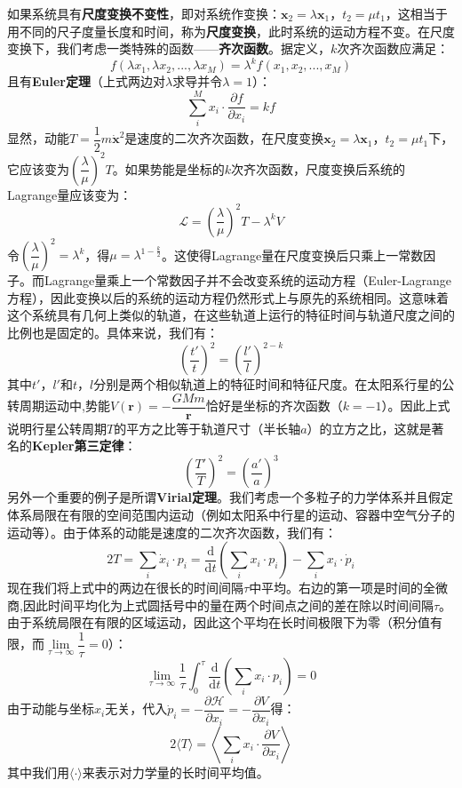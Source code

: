 \documentclass[a4paper,openany]{book}
\begin{document}
如果系统具有\textbf{尺度变换不变性}，即对系统作变换：$\bm{x}_2 = \lambda \bm{x}_1$，$t_2 = \mu t_1$，这相当于用不同的尺子度量长度和时间，称为\textbf{尺度变换}，此时系统的运动方程不变。在尺度变换下，我们考虑一类特殊的函数——\textbf{齐次函数}。据定义，$k$次齐次函数应满足：
\[
    \boxed{f(\lambda x_1, \lambda x_2,...,\lambda x_M) = \lambda^k f(x_1,x_2,...,x_M)}
\]
且有\textbf{Euler定理}（上式两边对$\lambda$求导并令$\lambda=1$）：
\[
    \boxed{\sum_i^M x_i \cdot \frac{\partial f}{\partial x_i} = kf}
\]
显然，动能$T = \dfrac{1}{2}m\bm{\dot{x}}^2$是速度的二次齐次函数，在尺度变换$\bm{x}_2 = \lambda \bm{x}_1$，$t_2 = \mu t_1$下，它应该变为$\left(\dfrac{\lambda}{\mu}\right)^2 T$。如果势能是坐标的$k$次齐次函数，尺度变换后系统的Lagrange量应该变为：
\[
    \mathcal{L} = \left(\frac{\lambda}{\mu}\right)^2 T - \lambda^k V
\]
令$\left(\dfrac{\lambda}{\mu}\right)^2 = \lambda^k$，得$\mu = \lambda^{1-\tfrac{k}{2}}$。这使得Lagrange量在尺度变换后只乘上一常数因子。而Lagrange量乘上一个常数因子并不会改变系统的运动方程（Euler-Lagrange方程），因此变换以后的系统的运动方程仍然形式上与原先的系统相同。这意味着这个系统具有几何上类似的轨道，在这些轨道上运行的特征时间与轨道尺度之间的比例也是固定的。具体来说，我们有：
\[
    \left(\frac{t'}{t}\right)^2 = \left(\frac{l'}{l}\right)^{2-k}
\]
其中$t'$，$l'$和$t$，$l$分别是两个相似轨道上的特征时间和特征尺度。在太阳系行星的公转周期运动中,势能$V(\bm{r}) = -\dfrac{GMm}{\bm{r}}$恰好是坐标的齐次函数（$k=-1$）。因此上式说明行星公转周期$T$的平方之比等于轨道尺寸（半长轴$a$）的立方之比，这就是著名的\textbf{Kepler第三定律}：
\[
    \boxed{\left(\frac{T'}{T}\right)^2 = \left(\frac{a'}{a}\right)^3}
\]
另外一个重要的例子是所谓\textbf{Virial定理}。我们考虑一个多粒子的力学体系并且假定体系局限在有限的空间范围内运动（例如太阳系中行星的运动、容器中空气分子的运动等）。由于体系的动能是速度的二次齐次函数，我们有：
\[
    2T = \sum_i \dot{x}_i \cdot p_i = \frac{\mathrm{d}}{\mathrm{d}t}\left(\sum_i x_i \cdot p_i\right) - \sum_i x_i \cdot \dot{p}_i
\]
现在我们将上式中的两边在很长的时间间隔$\tau$中平均。右边的第一项是时间的全微商,因此时间平均化为上式圆括号中的量在两个时间点之间的差在除以时间间隔$\tau$。由于系统局限在有限的区域运动，因此这个平均在长时间极限下为零（积分值有限，而$\lim\limits_{\tau \to \infty}\dfrac{1}{\tau} = 0$）：
\[
    \lim_{\tau \to \infty}\frac{1}{\tau}\int_0^\tau \frac{\mathrm{d}}{\mathrm{d}t}\left(\sum_i x_i \cdot p_i\right) = 0
\]
由于动能与坐标$x_i$无关，代入$\dot{p}_i = -\dfrac{\partial \mathcal{H}}{\partial x_i} = -\dfrac{\partial V}{\partial x_i}$得：
\[
    2\langle T \rangle = \left\langle \sum_i x_i \cdot \frac{\partial V}{\partial x_i} \right\rangle
\]
其中我们用$\langle\cdot\rangle$来表示对力学量的长时间平均值。
\end{document}
